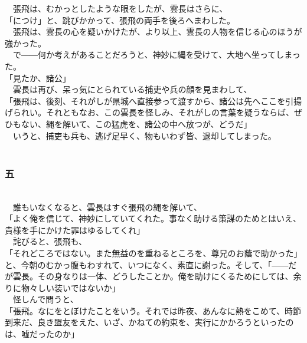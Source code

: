 \documentclass[
  paper=a5,
  fontsize=10pt,
  jafontsize=9.5pt,
  tate,                  %
  open_bracket_pos=nibu, %
]{jlreq}
\begin{document}
　張飛は、むかっとしたような眼をしたが、雲長はさらに、\\


「につけ」と、跳びかかって、張飛の両手を後ろへまわした。\\


　張飛は、雲長の心を疑いかけたが、より以上、雲長の人物を信じる心のほうが強かった。\\


　で――何か考えがあることだろうと、神妙に縄を受けて、大地へ坐ってしまった。\\


「見たか、諸公」\\


　雲長は再び、呆っ気にとられている捕吏や兵の顔を見まわして、\\


「張飛は、後刻、それがしが県城へ直接参って渡すから、諸公は先へここを引揚げられい。それともなお、この雲長を怪しみ、それがしの言葉を疑うならば、ぜひもない、縄を解いて、この猛虎を、諸公の中へ放つが、どうだ」\\


　いうと、捕吏も兵も、逃げ足早く、物もいわず皆、退却してしまった。\\

\\

\subsubsection{五}

\\


　誰もいなくなると、雲長はすぐ張飛の縄を解いて、\\


「よく俺を信じて、神妙にしていてくれた。事なく助ける策謀のためとはいえ、貴様を手にかけた罪はゆるしてくれ」\\


　詫びると、張飛も、\\


「それどころではない。また無益のを重ねるところを、尊兄のお蔭で助かった」と、今朝のむかっ腹もわすれて、いつになく、素直に謝った。そして、「――だが雲長。その身なりは一体、どうしたことか。俺を助けにくるためにしては、余りに物々しい装いではないか」\\


　怪しんで問うと、\\


「張飛。なにをとぼけたことをいう。それでは昨夜、あんなに熱をこめて、時節到来だ、良き盟友をえた、いざ、かねての約束を、実行にかかろうといったのは、嘘だったのか」\\
\end{document}

